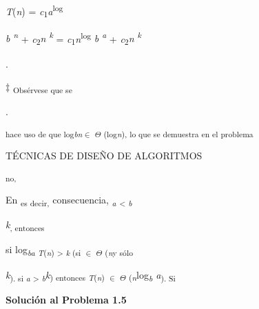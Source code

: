\documentclass[12pt]{article}
\renewcommand{\_}{\kern-1.5pt\textunderscore\kern-1.5pt}
\begin{document}
\textit{T}(\textit{n}) = \textit{c}\textsubscript{1}\textit{a}\textsuperscript{log}{\fontsize{5pt}{6.0pt}\selectfont \textit{b \textsuperscript{n }}+ \textit{c}\textsubscript{2}\textit{n \textsuperscript{k }}= \textit{c}\textsubscript{1}\textit{n}\textsuperscript{log }\textit{b \textsuperscript{a }}+ \textit{c}\textsubscript{2}\textit{n \textsuperscript{k}}{\fontsize{10pt}{12.0pt}\selectfont . \par}\par}\par

{\fontsize{6pt}{7.2pt}\selectfont $\ddag$  \textsubscript{Obsérvese que se }{\fontsize{10pt}{12.0pt}. \par}\par}\par

\textsubscript{hace uso de que log\textit{bn}$ \in $ $ \Theta $ (log\textit{n}), lo que se demuestra en el problema }\par

{\fontsize{10pt}{12.0pt} {\fontsize{7pt}{8.4pt}\selectfont TÉCNICAS DE DISEÑO DE ALGORITMOS \par}\par}\par

\textsubscript{no, }{\fontsize{10pt}{12.0pt}\selectfont En \textsubscript{es decir, }consecuencia, \textit{\textsubscript{a }}\textsubscript{< \textit{b}}{\fontsize{7pt}{8.4pt}\selectfont \textit{k}\textsubscript{, entonces }{\fontsize{10pt}{12.0pt}\selectfont si log\textit{\textsubscript{ba T}}\textsubscript{(\textit{n}) > \textit{k }(si $ \in $ $ \Theta $ (\textit{n}y sólo }{\fontsize{7pt}{8.4pt}\selectfont \textit{k}\textsubscript{). si \textit{a }> \textit{b}}\textit{k}\textsubscript{) entonces \textit{T}(\textit{n}) $ \in $ $ \Theta $ (\textit{n}}log\textit{\textsubscript{b }a}\textsubscript{). Si }{\fontsize{10pt}{12.0pt}\selectfont \textbf{Solución al Problema 1.5 }\par}\par}\par}\par}\par}\par
\end{document}
